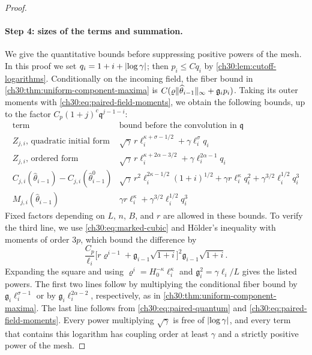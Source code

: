\begin{proof}
\paragraph{Step 4: sizes of the terms and summation.} We give the quantitative bounds before suppressing positive powers of the mesh. In this proof we set $q_i=1+i+\lvert \log\gamma\rvert$; then $p_i\le Cq_i$ by \cref{ch30:lem:cutoff-logarithms}. Conditionally on the incoming field, the fiber bound in \cref{ch30:thm:uniform-component-maxima} is $C(\varrho\lVert \widehat\theta_{i-1}\rVert_\infty+\mathfrak g_ip_i)$. Taking its outer moments with \eqref{ch30:eq:paired-field-moments}, we obtain the following bounds, up to the factor $C_p(1+j)^c\mathfrak q^{j-1-i}$:
\begin{equation}\label{ch30:eq:paired-sizes}
\begin{array}{c|l}
 \text{term}&\text{bound before the convolution in }\mathfrak q\\\hline
 Z_{j,i}\text{, quadratic initial form}&\sqrt\gamma\,r\ell_i^{\kappa+\sigma-1/2}+\gamma\ell_i^\sigma q_i\\
 Z_{j,i}\text{, ordered form}&\sqrt\gamma\,r\ell_i^{\kappa+2\alpha-3/2}+\gamma\ell_i^{2\alpha-1}q_i\\
 C_{j,i}(\widehat\theta_{i-1})-C_{j,i}(\widehat\theta_{i-1}^0)&\sqrt\gamma\,r^2\ell_i^{2\kappa-1/2}(1+i)^{1/2}+\gamma r\ell_i^\kappa q_i^2+\gamma^{3/2}\ell_i^{1/2}q_i^3\\
 M_{j,i}(\widehat\theta_{i-1})&\gamma r\ell_i^\kappa+\gamma^{3/2}\ell_i^{1/2}q_i^3
\end{array}
\end{equation}
Fixed factors depending on $L$, $n$, $B$, and $r$ are allowed in these bounds. To verify the third line, we use \eqref{ch30:eq:marked-cubic} and H\"older's inequality with moments of order $3p$, which bound the difference by
\[
 \frac{C_p}{\ell_i}\bigl[r\varrho^{i-1}+\mathfrak g_{i-1}\sqrt{1+i}\bigr]^2\mathfrak g_{i-1}\sqrt{1+i}.
\]
Expanding the square and using $\varrho^i=H_0^{-\kappa}\ell_i^\kappa$ and $\mathfrak g_i^2=\gamma\ell_i/L$ gives the listed powers. The first two lines follow by multiplying the conditional fiber bound by $\mathfrak g_i\ell_i^{\sigma-1}$ or by $\mathfrak g_i\ell_i^{2\alpha-2}$, respectively, as in \cref{ch30:thm:uniform-component-maxima}. The last line follows from \eqref{ch30:eq:paired-quantum} and \eqref{ch30:eq:paired-field-moments}. Every power multiplying $\sqrt\gamma$ is free of $\lvert \log\gamma\rvert$, and every term that contains this logarithm has coupling order at least $\gamma$ and a strictly positive power of the mesh.


\end{proof}

